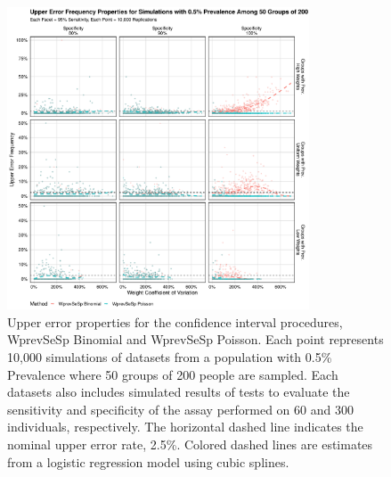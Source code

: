 \documentclass[AMA,STIX1COL]{WileyNJD-v2}
\begin{document}
\begin{figure}
\centering
\includegraphics[width=0.8\textwidth]{figures/imperfect_upper_error_frequency_50_groups_0_005_prev.pdf}
\caption{Upper error properties for the confidence interval procedures, WprevSeSp Binomial and WprevSeSp Poisson.
Each point represents 10,000 simulations of datasets from a population with 0.5\% Prevalence where 50 groups of 200 people are sampled.
Each datasets also includes simulated results of tests to evaluate the sensitivity and specificity of the assay performed on 60 and 300 individuals, respectively.
The horizontal dashed line indicates the nominal upper error rate, 2.5\%.
Colored dashed lines are estimates from a logistic regression model using cubic splines.}
\label{fig:imperfect_upper_error_frequency_50_groups_0_005_prev}
\end{figure}
\end{document}
